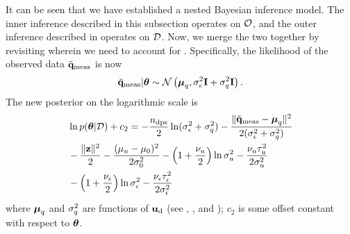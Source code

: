 It can be seen that we have established a nested Bayesian inference model. The inner inference described in this subsection operates on $\mathcal{O}$, and the outer inference described in  operates on $\mathcal{D}$. Now, we merge the two together by revisiting  wherein we need to account for . Specifically, the likelihood of the observed data $\tilde{\mathbf{q}}_{\text{meas}}$ is now
\begin{equation} \elabel{noise-approximation-model}
  \mvT_\meas | \vparam \sim \gaussian{\vmean_\T}{\sigma_\noise^2 \mI + \sigma_\T^2 \mI}.
\end{equation}
The new posterior on the logarithmic scale is
\begin{align}
  & \ln \f{\vparam | \Data} + c_2 = -\frac{\ndps}{2} \ln(\sigma^2_\noise + \sigma^2_\T) - \frac{\norm{\mvT_\meas - \vmean_\T}^2}{2 (\sigma^2_\noise + \sigma^2_\T)} \nonumber \\
  & {} - \frac{\norm{\vz}^2}{2} - \frac{(\mu_\u - \mu_0)^2}{2 \sigma^2_0} - \left(1 + \frac{\nu_\u}{2}\right) \ln \sigma^2_\u - \frac{\nu_\u \tau_\u^2}{2 \sigma^2_\u} \nonumber \\
  & {} - \left(1 + \frac{\nu_\noise}{2}\right) \ln \sigma^2_\noise - \frac{\nu_\noise \tau_\noise^2}{2 \sigma^2_\noise} \elabel{log-posterior-surrogate}
\end{align}
where ${\boldsymbol\mu}_q$ and $\sigma^2_q$ are functions of $\mathbf{u}_{\text{d}}$ (see , , and ); $c_2$ is some offset constant with respect to ${\boldsymbol\theta}$.
